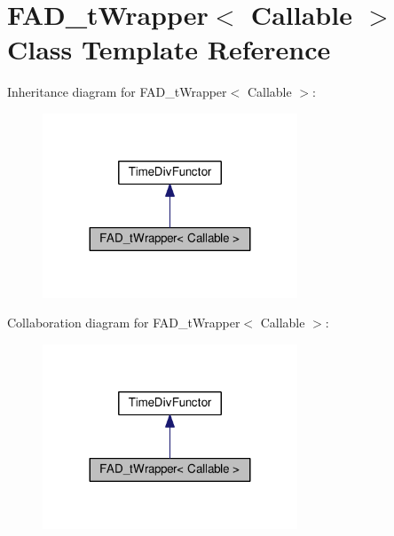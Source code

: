 \hypertarget{classFAD__tWrapper}{}\section{F\+A\+D\+\_\+t\+Wrapper$<$ Callable $>$ Class Template Reference}
\label{classFAD__tWrapper}


Inheritance diagram for F\+A\+D\+\_\+t\+Wrapper$<$ Callable $>$\+:
\nopagebreak
\begin{figure}[H]
\begin{center}
\leavevmode
\includegraphics[width=215pt]{classFAD__tWrapper__inherit__graph}
\end{center}
\end{figure}


Collaboration diagram for F\+A\+D\+\_\+t\+Wrapper$<$ Callable $>$\+:
\nopagebreak
\begin{figure}[H]
\begin{center}
\leavevmode
\includegraphics[width=215pt]{classFAD__tWrapper__coll__graph}
\end{center}
\end{figure}
